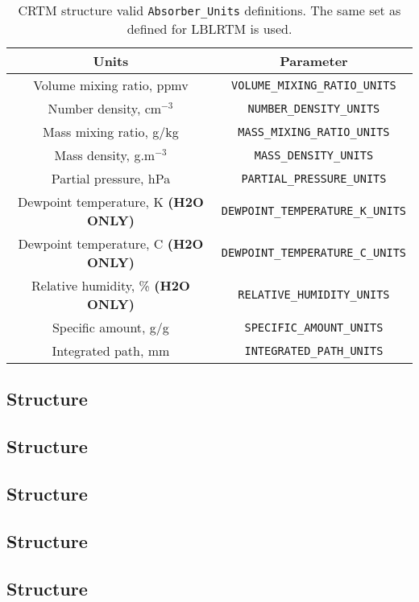 \begin{table}
  \centering
  \begin{tabular}{|c|c|}
    \hline
    \sffamily\textbf{Units} & \sffamily\textbf{Parameter} \\
    \hline\hline
     Volume mixing ratio, ppmv                    & \texttt{VOLUME\_MIXING\_RATIO\_UNITS} \\
     Number density, cm$^{-3}$                    & \texttt{NUMBER\_DENSITY\_UNITS} \\
     Mass mixing ratio, g/kg                      & \texttt{MASS\_MIXING\_RATIO\_UNITS} \\
     Mass density, g.m$^{-3}$                     & \texttt{MASS\_DENSITY\_UNITS} \\
     Partial pressure, hPa                        & \texttt{PARTIAL\_PRESSURE\_UNITS} \\
     Dewpoint temperature, K  \textbf{(H2O ONLY)} & \texttt{DEWPOINT\_TEMPERATURE\_K\_UNITS} \\
     Dewpoint temperature, C  \textbf{(H2O ONLY)} & \texttt{DEWPOINT\_TEMPERATURE\_C\_UNITS} \\
     Relative humidity, \%    \textbf{(H2O ONLY)} & \texttt{RELATIVE\_HUMIDITY\_UNITS} \\
     Specific amount, g/g                         & \texttt{SPECIFIC\_AMOUNT\_UNITS} \\
     Integrated path, mm                          & \texttt{INTEGRATED\_PATH\_UNITS} \\
    \hline
  \end{tabular}
  \caption{CRTM \Atmosphere{} structure valid \texttt{Absorber\_Units} definitions. The same set as defined for LBLRTM is used.}
  \label{tab:absorber_units}
\end{table}


\subsection{\Surface{} Structure}

\subsection{\GeometryInfo{} Structure}

\subsection{\ChannelInfo{} Structure}

\subsection{\RTSolution{} Structure}

\subsection{\Options{} Structure}


